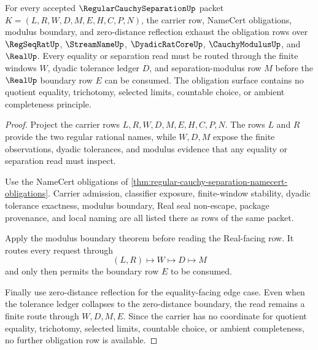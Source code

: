 \begin{theorem}
\label{thm:regular-cauchy-separation-obligation-scope}
For every accepted $\RegularCauchySeparationUp$ packet $K=(L,R,W,D,M,E,H,C,P,N)$, the carrier row, NameCert obligations, modulus boundary, and zero-distance reflection exhaust the obligation rows over $\RegSeqRatUp$, $\StreamNameUp$, $\DyadicRatCoreUp$, $\CauchyModulusUp$, and $\RealUp$. Every equality or separation read must be routed through the finite windows $W$, dyadic tolerance ledger $D$, and separation-modulus row $M$ before the $\RealUp$ boundary row $E$ can be consumed. The obligation surface contains no quotient equality, trichotomy, selected limits, countable choice, or ambient completeness principle.
\end{theorem}
\begin{proof}
Project the carrier rows $L,R,W,D,M,E,H,C,P,N$. The rows $L$ and $R$ provide the two regular rational names, while $W,D,M$ expose the finite observations, dyadic tolerances, and modulus evidence that any equality or separation read must inspect.

Use the NameCert obligations of \autoref{thm:regular-cauchy-separation-namecert-obligations}. Carrier admission, classifier exposure, finite-window stability, dyadic tolerance exactness, modulus boundary, Real seal non-escape, package provenance, and local naming are all listed there as rows of the same packet.

Apply the modulus boundary theorem before reading the Real-facing row. It routes every request through
$$
(L,R)\longmapsto W\longmapsto D\longmapsto M
$$
and only then permits the boundary row $E$ to be consumed.

Finally use zero-distance reflection for the equality-facing edge case. Even when the tolerance ledger collapses to the zero-distance boundary, the read remains a finite route through $W,D,M,E$. Since the carrier has no coordinate for quotient equality, trichotomy, selected limits, countable choice, or ambient completeness, no further obligation row is available.
\end{proof}

